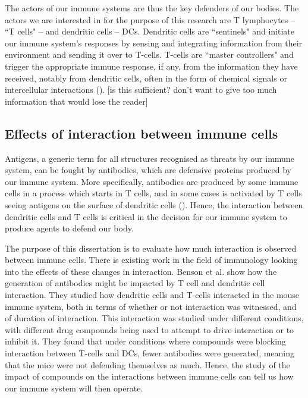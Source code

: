
The actors of our immune systems are thus the key defenders of our bodies. The actors we are interested in for the purpose of this research are T lymphocytes – ``T cells" – and dendritic cells – DCs. Dendritic cells are ``sentinels" and initiate our immune system's responses by sensing and integrating information from their environment and sending it over to T-cells. T-cells are ``master controllers" and trigger the appropriate immune response, if any, from the information they have received, notably from dendritic cells, often in the form of chemical signals or intercellular interactions (\cite{https://www.immunology.org/public-information/bitesized-immunology/cells/dendritic-cells, https://www.youtube.com/watch?v=hRvyCYyab68}). [is this sufficient? don't want to give too much information that would lose the reader]



\subsection{Effects of interaction between immune cells} \label{bg:interaction}

Antigens, a generic term for all structures recognised as threats by our immune system, can be fought by antibodies, which are defensive proteins produced by our immune system. More specifically, antibodies are produced by some immune cells in a process which starts in T cells, and in some cases is activated by T cells seeing antigens on the surface of dendritic cells (\cite{https://elifesciences.org/articles/06994}). Hence, the interaction between dendritic cells and T cells is critical in the decision for our immune system to produce agents to defend our body.

The purpose of this dissertation is to evaluate how much interaction is observed between immune cells. There is existing work in the field of immunology looking into the effects of these changes in interaction. Benson et al. show how the generation of antibodies might be impacted by T cell and dendritic cell interaction. They studied how dendritic cells and T-cells interacted in the mouse immune system, both in terms of whether or not interaction was witnessed, and of duration of interaction. This interaction was studied under different conditions, with different drug compounds being used to attempt to drive interaction or to inhibit it. They found that under conditions where compounds were blocking interaction between T-cells and DCs, fewer antibodies were generated, meaning that the mice were not defending themselves as much. Hence, the study of the impact of compounds on the interactions between immune cells can tell us how our immune system will then operate.

